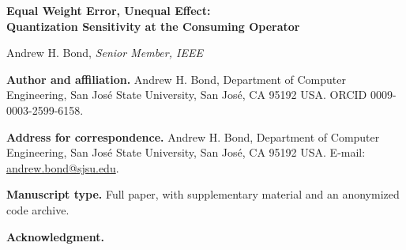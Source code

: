 \documentclass[11pt]{article}
\begin{document}
\begin{center}
{\Large\bfseries Equal Weight Error, Unequal Effect:\\[0.2em]
Quantization Sensitivity at the Consuming Operator\par}
\vspace{1.2em}
{\large Andrew H. Bond, \emph{Senior Member, IEEE}\par}
\end{center}

\vspace{0.8em}

\textbf{Author and affiliation.} Andrew H. Bond, Department of Computer Engineering, San
Jos\'e State University, San Jos\'e, CA 95192 USA. ORCID 0009-0003-2599-6158.

\textbf{Address for correspondence.} Andrew H. Bond, Department of Computer Engineering, San
Jos\'e State University, San Jos\'e, CA 95192 USA. E-mail: \href{mailto:andrew.bond@sjsu.edu}{andrew.bond@sjsu.edu}.

\textbf{Manuscript type.} Full paper, with supplementary material and an anonymized code archive.

\textbf{Acknowledgment.} 
\end{document}
